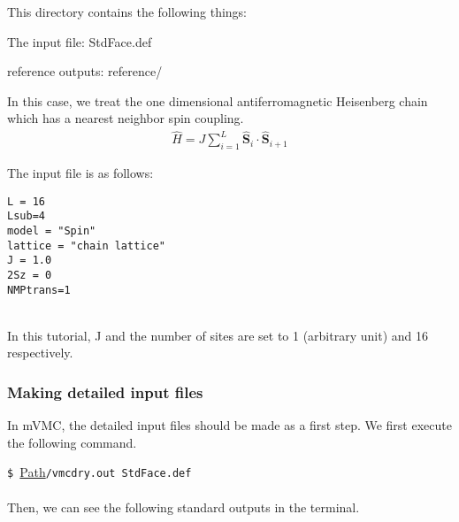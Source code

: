 This directory contains the following things:

The input file: StdFace.def

reference outputs: reference/

In this case, we treat the one dimensional antiferromagnetic Heisenberg chain
which has a nearest neighbor spin coupling.
\begin{align}
  {\hat H} = J \sum_{i=1}^{L} {\hat {\boldsymbol S}}_i \cdot {\hat {\boldsymbol S}}_{i+1}
\end{align}

The input file is as follows:
\\
\begin{minipage}{10cm}
\begin{screen}
\begin{verbatim}
L = 16
Lsub=4
model = "Spin"
lattice = "chain lattice"
J = 1.0
2Sz = 0
NMPtrans=1
\end{verbatim}
\end{screen}
\end{minipage}
%
\\
In this tutorial, J and the number of sites are set to 1 (arbitrary unit) and 16 respectively.

\subsubsection{Making detailed input files}
In mVMC, the detailed input files should be made as a first step.
We first execute the following command. 

\vspace{1cm}\hspace{-0.7cm}
\verb|$ |\underline{Path}\verb|/vmcdry.out StdFace.def|
\small
\\ \\
Then,  we can see the following standard outputs in the terminal.

